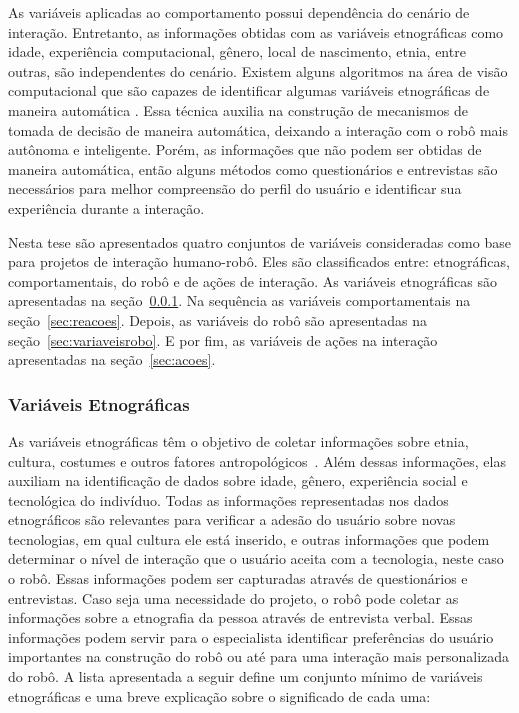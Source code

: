 As variáveis aplicadas ao comportamento 	possui dependência do cenário de interação. Entretanto, as informações obtidas com as variáveis etnográficas como idade, experiência computacional, gênero, local de nascimento, etnia, entre outras, são independentes do cenário. Existem alguns algoritmos na área de visão computacional que são capazes de identificar algumas variáveis etnográficas de maneira automática \cite{yang:2007, shan:2012, ylioinas:2012, samadi:2013, amaral:2014}. Essa técnica auxilia na construção de mecanismos de tomada de decisão de maneira automática, deixando a interação com o robô mais autônoma e inteligente. Porém, as informações que não podem ser obtidas de maneira automática, então alguns métodos como questionários e entrevistas são necessários para melhor compreensão do perfil do usuário e identificar sua experiência durante a interação.

Nesta tese são apresentados quatro conjuntos de variáveis consideradas como base para projetos de interação humano-robô. Eles são classificados entre: etnográficas, comportamentais, do robô e de ações de interação. As variáveis etnográficas são apresentadas na seção~\ref{sec:etnograficas}. Na sequência as variáveis comportamentais na seção~\ref{sec:reacoes}. Depois, as variáveis do robô são apresentadas na seção~\ref{sec:variaveisrobo}. E por fim, as variáveis de ações na interação apresentadas na seção~\ref{sec:acoes}.

\subsubsection{Variáveis Etnográficas}
\label{sec:etnograficas}
As variáveis etnográficas têm o objetivo de coletar informações sobre etnia, cultura, costumes e outros fatores antropológicos~\cite{borges:2005}. Além dessas informações, elas auxiliam na identificação de dados sobre idade, gênero, experiência social e tecnológica do indivíduo. Todas as informações representadas nos dados etnográficos são relevantes para verificar a adesão do usuário sobre novas tecnologias, em qual cultura ele está inserido, e outras informações que podem determinar o nível de interação que o usuário aceita com a tecnologia, neste caso o robô. Essas informações podem ser capturadas através de questionários e entrevistas. Caso seja uma necessidade do projeto, o robô pode coletar as informações sobre a etnografia da pessoa através de entrevista verbal. Essas informações podem servir para o especialista identificar preferências do usuário importantes na construção do robô ou até para uma interação mais personalizada do robô. A lista apresentada a seguir define um conjunto mínimo de variáveis etnográficas e uma breve explicação sobre o significado de cada uma:

